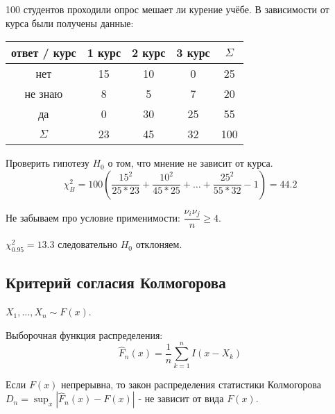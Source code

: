 \begin{ex}
  100 студентов проходили опрос мешает ли курение учёбе.
  В зависимости от курса были получены данные:

  \begin{center}
    \begin{tabular}{|c|c|c|c|c|}
      \hline
      ответ / курс & 1 курс & 2 курс & 3 курс & $ \Sigma $ \\
      \hline
      нет & 15 & 10 & 0 & 25\\
      \hline
      не знаю & 8 & 5 & 7 & 20 \\
      \hline
      да & 0 & 30 & 25 & 55 \\
      \hline
      $ \Sigma $  & 23 & 45 & 32 & 100 \\
      \hline
    \end{tabular}
  \end{center}

  Проверить гипотезу $H_0$ о том, что мнение не зависит от курса.
  \[
  \chi^2_B = 100 (\dfrac{15^2}{25*23} + \dfrac{10^2}{45*25} + \dots + \dfrac{25^2}{55*32} - 1) = 44.2
  \]

  Не забываем про условие применимости: $\dfrac{\nu_i \nu_j}{n} \geqslant 4$.

  $\chi^2_{0.95} = 13.3$ следовательно $H_0$ отклоняем.
\end{ex}

\subsection{Критерий согласия Колмогорова}

\begin{theorem}
  $X_1, \dots, X_n \sim F(x)$.

  Выборочная функция распределения:
  \[
    \hat{F}_n(x) = \dfrac{1}{n} \sum_{k=1}^n I(x-X_k)
  \]

  Если $F(x)$ непрерывна, то закон распределения статистики Колмогорова $D_n = \sup_x |\hat{F}_n(x) - F(x)|$ - не зависит от вида $F(x)$.
\end{theorem}

